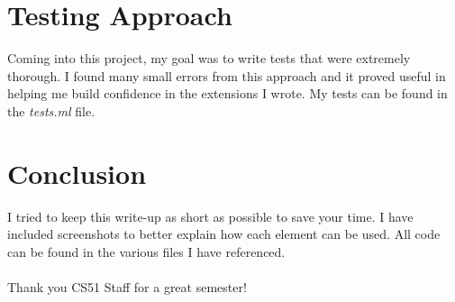 \documentclass{article}
\begin{document}
\section{Testing Approach}
    Coming into this project, my goal was to write tests that were extremely thorough. I found many small errors from this approach and it proved useful in helping me build confidence in the extensions I wrote. My tests can be found in the \textit{tests.ml} file.
    
\section{Conclusion}
    I tried to keep this write-up as short as possible to save your time. I have included screenshots to better explain how each element can be used. All code can be found in the various files I have referenced. \\ \\
    Thank you CS51 Staff for a great semester!
    
\end{document}

